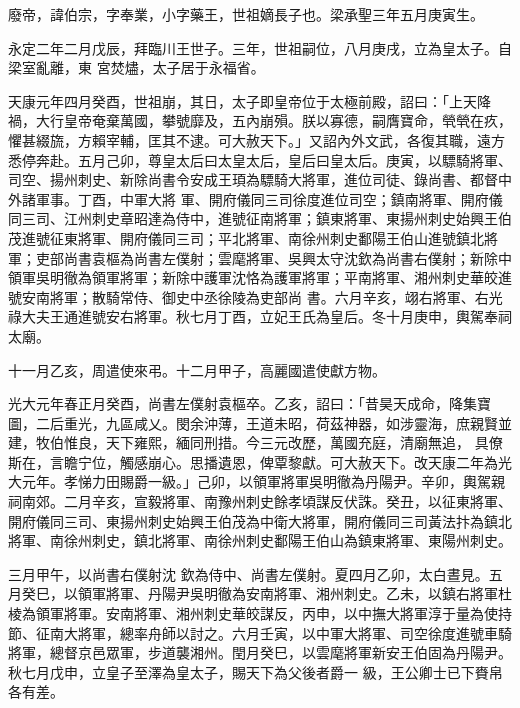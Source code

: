 
\begin{pinyinscope}

 廢帝，諱伯宗，字奉業，小字藥王，世祖嫡長子也。梁承聖三年五月庚寅生。



 永定二年二月戊辰，拜臨川王世子。三年，世祖嗣位，八月庚戌，立為皇太子。自梁室亂離，東
 宮焚燼，太子居于永福省。



 天康元年四月癸酉，世祖崩，其日，太子即皇帝位于太極前殿，詔曰：「上天降禍，大行皇帝奄棄萬國，攀號靡及，五內崩殞。朕以寡德，嗣膺寶命，煢煢在疚，懼甚綴旒，方賴宰輔，匡其不逮。可大赦天下。」又詔內外文武，各復其職，遠方悉停奔赴。五月己卯，尊皇太后曰太皇太后，皇后曰皇太后。庚寅，以驃騎將軍、司空、揚州刺史、新除尚書令安成王頊為驃騎大將軍，進位司徒、錄尚書、都督中外諸軍事。丁酉，中軍大將
 軍、開府儀同三司徐度進位司空；鎮南將軍、開府儀同三司、江州刺史章昭達為侍中，進號征南將軍；鎮東將軍、東揚州刺史始興王伯茂進號征東將軍、開府儀同三司；平北將軍、南徐州刺史鄱陽王伯山進號鎮北將軍；吏部尚書袁樞為尚書左僕射；雲麾將軍、吳興太守沈欽為尚書右僕射；新除中領軍吳明徹為領軍將軍；新除中護軍沈恪為護軍將軍；平南將軍、湘州刺史華皎進號安南將軍；散騎常侍、御史中丞徐陵為吏部尚
 書。六月辛亥，翊右將軍、右光祿大夫王通進號安右將軍。秋七月丁酉，立妃王氏為皇后。冬十月庚申，輿駕奉祠太廟。



 十一月乙亥，周遣使來弔。十二月甲子，高麗國遣使獻方物。



 光大元年春正月癸酉，尚書左僕射袁樞卒。乙亥，詔曰：「昔昊天成命，降集寶圖，二后重光，九區咸乂。閔余沖薄，王道未昭，荷茲神器，如涉靈海，庶親賢並建，牧伯惟良，天下雍熙，緬同刑措。今三元改歷，萬國充庭，清廟無追，
 具僚斯在，言瞻宁位，觸感崩心。思播遺恩，俾覃黎獻。可大赦天下。改天康二年為光大元年。孝悌力田賜爵一級。」己卯，以領軍將軍吳明徹為丹陽尹。辛卯，輿駕親祠南郊。二月辛亥，宣毅將軍、南豫州刺史餘孝頃謀反伏誅。癸丑，以征東將軍、開府儀同三司、東揚州刺史始興王伯茂為中衛大將軍，開府儀同三司黃法抃為鎮北將軍、南徐州刺史，鎮北將軍、南徐州刺史鄱陽王伯山為鎮東將軍、東陽州刺史。



 三月甲午，以尚書右僕射沈
 欽為侍中、尚書左僕射。夏四月乙卯，太白晝見。五月癸巳，以領軍將軍、丹陽尹吳明徹為安南將軍、湘州刺史。乙未，以鎮右將軍杜棱為領軍將軍。安南將軍、湘州刺史華皎謀反，丙申，以中撫大將軍淳于量為使持節、征南大將軍，總率舟師以討之。六月壬寅，以中軍大將軍、司空徐度進號車騎將軍，總督京邑眾軍，步道襲湘州。閏月癸巳，以雲麾將軍新安王伯固為丹陽尹。秋七月戊申，立皇子至澤為皇太子，賜天下為父後者爵一
 級，王公卿士已下賚帛各有差。




\end{pinyinscope}
